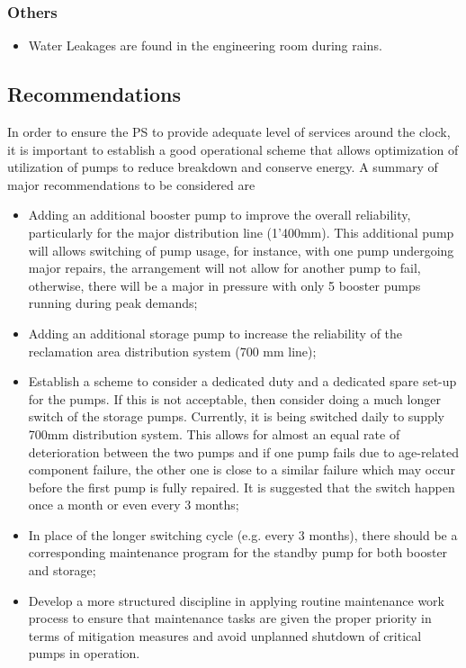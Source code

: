 \subsubsection{Others}
\begin{itemize}
	\item Water Leakages are found in the engineering room during rains.
\end{itemize}

\subsection{Recommendations}
In order to ensure the PS to provide adequate level of services around the clock, it is important to establish a good operational scheme that allows optimization of utilization of pumps to reduce breakdown and conserve energy. A summary of major recommendations to be considered are
\begin{itemize}
\item Adding an additional booster pump to improve the overall reliability, particularly for the major distribution line (1'400mm). This additional pump will allows switching of pump usage, for instance, with one pump undergoing major repairs, the arrangement will not allow for another pump to fail, otherwise, there will be a major in pressure with only 5 booster pumps running during peak demands;
\item Adding an additional storage pump to increase the reliability of the reclamation area distribution system (700 mm line);
\item Establish a scheme to consider a dedicated duty and a dedicated spare set-up for the pumps. If this is not acceptable, then consider doing a much longer switch of the storage pumps. Currently, it is being switched daily to supply 700mm distribution system. This allows for almost an equal rate of deterioration between the two pumps and if one pump fails due to age-related component failure, the other one is close to a similar failure which may occur before the first pump is fully repaired. It is suggested that the switch happen once a month or even every 3 months;
\item In place of the longer switching cycle (e.g. every 3 months), there should be a corresponding maintenance program for the standby pump for both booster and storage;

\item Develop a more structured discipline in applying routine maintenance work process to ensure that maintenance tasks are given the proper priority in terms of mitigation measures and avoid unplanned shutdown of critical pumps in operation.
\end{itemize}

